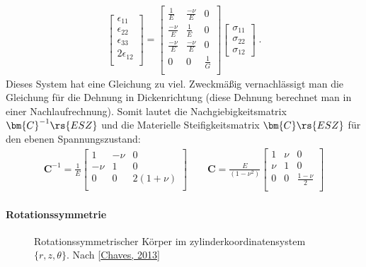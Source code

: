 \documentclass[letterpaper,10pt,german]{jupyterBook}
\let\sphinxpxdimen\pdfpxdimen\else\newdimen\sphinxpxdimen
\begin{document}
\begin{equation}\label{equation:chapters/chapter1/elasticity:generalHookESZ2}
\begin{split}\begin{bmatrix} 
\epsilon_{11} \\
\epsilon_{22} \\
\epsilon_{33} \\
2\epsilon_{12} \\
\end{bmatrix} = \begin{bmatrix}
\frac{1}{E} & \frac{-\nu}{E}  & 0  \\
\frac{-\nu}{E} & \frac{1}{E}  & 0  \\
{\frac{-\nu}{E}} & {\frac{-\nu}{E}} & {0} \\
0 & 0 & \frac{1}{G}  \\
\end{bmatrix} \begin{bmatrix} \sigma_{11} \\ \sigma_{22} \\ \sigma_{12} \end{bmatrix} \; .\end{split}
\end{equation}
\sphinxAtStartPar
Dieses System hat eine Gleichung zu viel. Zweckmäßig vernachlässigt man die Gleichung für die Dehnung in Dickenrichtung (diese Dehnung berechnet man in einer Nachlaufrechnung). Somit lautet die Nachgiebigkeitsmatrix \(\bm{C}^{-1}\rs{ESZ}\) und die Materielle Steifigkeitsmatrix \(\bm{C}\rs{ESZ}\) für den ebenen Spannungszustand:
\begin{equation}\label{equation:chapters/chapter1/elasticity:generalHookESZ3}
\begin{split}\bm{C}^{-1} = \frac{1}{E} \begin{bmatrix}
1 & -\nu & 0  \\
-\nu & 1  & 0  \\
0 & 0 & 2(1+\nu)  \\
\end{bmatrix}  \qquad 
\bm{C} = \frac{E}{(1-\nu^2)}\begin{bmatrix}
1 & \nu  & 0  \\
\nu & 1  & 0  \\
0 & 0 & \frac{1-\nu}{2}  \\
\end{bmatrix}\end{split}
\end{equation}

\paragraph{Rotationssymmetrie}
\label{\detokenize{chapters/chapter1/elasticity:rotationssymmetrie}}
\begin{figure}[htbp]
\centering
\capstart

\noindent\sphinxincludegraphics[height=300\sphinxpxdimen]{{Rotsym}.png}
\caption{Rotationssymmetrischer Körper im zylinderkoordinatensystem \(\{r,z,\theta\}\). Nach {[}\hyperlink{cite.quellen:id10}{Chaves, 2013}{]}}\label{\detokenize{chapters/chapter1/elasticity:rotsym}}\end{figure}
\end{document}

